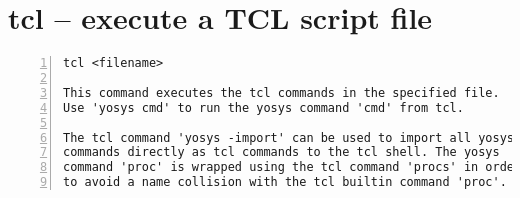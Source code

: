 \section{tcl -- execute a TCL script file}
\label{cmd:tcl}
\begin{lstlisting}[numbers=left,frame=single]
    tcl <filename>

This command executes the tcl commands in the specified file.
Use 'yosys cmd' to run the yosys command 'cmd' from tcl.

The tcl command 'yosys -import' can be used to import all yosys
commands directly as tcl commands to the tcl shell. The yosys
command 'proc' is wrapped using the tcl command 'procs' in order
to avoid a name collision with the tcl builtin command 'proc'.
\end{lstlisting}

